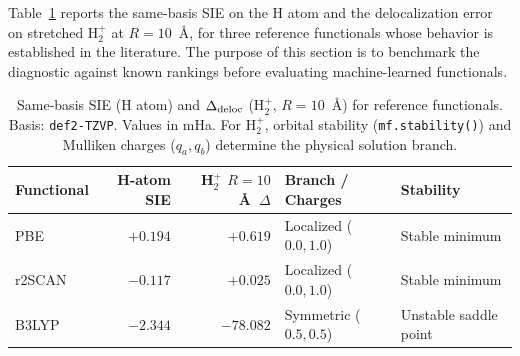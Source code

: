\documentclass[11pt]{report}
\theoremstyle{definition}
\theoremstyle{remark}
\begin{document}
Table~\ref{tab:repro} reports the same-basis SIE on the H atom and the
delocalization error on stretched H$_2^+$ at $R = 10$~\AA, for three reference
functionals whose behavior is established in the literature.
The purpose of this section is to benchmark the diagnostic against known
rankings before evaluating machine-learned functionals.

\begin{table}[htbp]
\centering
\caption{Same-basis SIE (H atom) and $\Delta_{\rm deloc}$ (H$_2^+$,
$R = 10$~\AA) for reference functionals. Basis: \texttt{def2-TZVP}.
Values in mHa. For H$_2^+$, orbital stability (\texttt{mf.stability()}) and
Mulliken charges ($q_a, q_b$) determine the physical solution branch.}
\label{tab:repro}
\begin{tabular}{lrrll}
\toprule
Functional & H-atom SIE & H$_2^+$ $R{=}10$~\AA\ $\Delta$ & Branch / Charges & Stability \\
\midrule
PBE~\cite{PBE1996}       & $+0.194$ & $+0.619$  & Localized ($0.0, 1.0$) & Stable minimum \\
r2SCAN~\cite{r2SCAN2020} & $-0.117$ & $+0.025$  & Localized ($0.0, 1.0$) & Stable minimum \\
B3LYP~\cite{B3LYP1994}   & $-2.344$ & $-78.082$ & Symmetric ($0.5, 0.5$) & Unstable saddle point \\
\bottomrule
\end{tabular}
\end{table}
\end{document}
